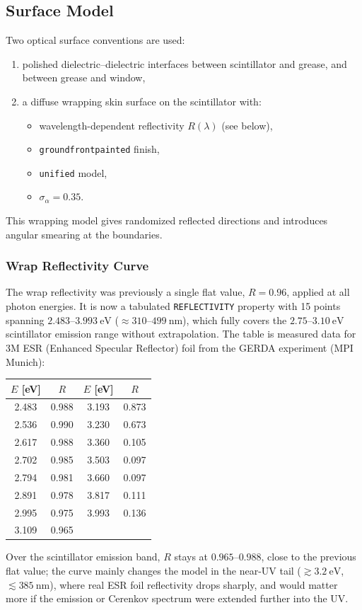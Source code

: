 \subsection{Surface Model}
Two optical surface conventions are used:
\begin{enumerate}[label=\arabic*.]
\item polished dielectric--dielectric interfaces between scintillator and grease, and between grease and window,
\item a diffuse wrapping skin surface on the scintillator with:
  \begin{itemize}
  \item wavelength-dependent reflectivity $R(\lambda)$ (see below),
  \item \texttt{groundfrontpainted} finish,
  \item \texttt{unified} model,
  \item $\sigma_\alpha = 0.35$.
  \end{itemize}
\end{enumerate}

This wrapping model gives randomized reflected directions and introduces angular smearing at the boundaries.

\subsubsection{Wrap Reflectivity Curve}
The wrap reflectivity was previously a single flat value, $R=0.96$, applied
at all photon energies. It is now a tabulated \texttt{REFLECTIVITY}
property with 15 points spanning $2.483$--$3.993~\mathrm{eV}$
($\approx 310$--$499~\mathrm{nm}$), which fully covers the
$2.75$--$3.10~\mathrm{eV}$ scintillator emission range without
extrapolation. The table is measured data for 3M ESR (Enhanced Specular
Reflector) foil from the GERDA experiment (MPI Munich):
\begin{center}
\begin{tabular}{cccc}
\toprule
$E$ [eV] & $R$ & $E$ [eV] & $R$ \\
\midrule
2.483 & 0.988 & 3.193 & 0.873 \\
2.536 & 0.990 & 3.230 & 0.673 \\
2.617 & 0.988 & 3.360 & 0.105 \\
2.702 & 0.985 & 3.503 & 0.097 \\
2.794 & 0.981 & 3.660 & 0.097 \\
2.891 & 0.978 & 3.817 & 0.111 \\
2.995 & 0.975 & 3.993 & 0.136 \\
3.109 & 0.965 & & \\
\bottomrule
\end{tabular}
\end{center}
Over the scintillator emission band, $R$ stays at $0.965$--$0.988$, close to
the previous flat value; the curve mainly changes the model in the
near-UV tail ($\gtrsim 3.2~\mathrm{eV}$, $\lesssim 385~\mathrm{nm}$), where
real ESR foil reflectivity drops sharply, and would matter more if the
emission or Cerenkov spectrum were extended further into the UV.

